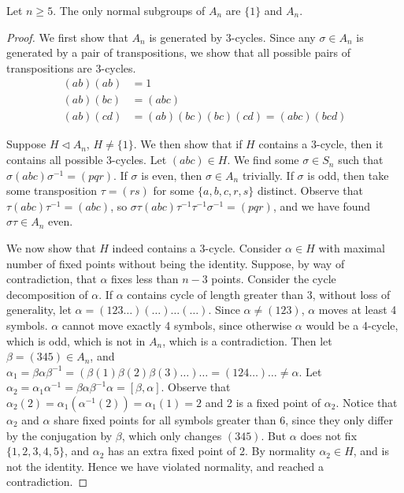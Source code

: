 \begin{theorem}\label{thm:an-simple}
    Let \(n \geq 5\).
    The only normal subgroups of \(A_n\) are \(\{1\}\) and \(A_n\).
\end{theorem}
\begin{proof}
    We first show that \(A_n\) is generated by 3-cycles.
    Since any \(\sigma \in A_n\) is generated by a pair of transpositions,
    we show that all possible pairs of transpositions are 3-cycles.
    \begin{align*}
        (ab)(ab) &= 1 \\
        (ab)(bc) &= (abc) \\
        (ab)(cd) &= (ab)(bc)(bc)(cd) = (abc)(bcd)
    \end{align*}

    Suppose \(H \lhd A_n\), \(H \neq \{1\}\).
    We then show that if \(H\) contains a 3-cycle,
    then it contains all possible 3-cycles.
    Let \((abc) \in H\).
    We find some \(\sigma \in S_n\) such that \(\sigma(abc)\sigma^{-1} = (pqr)\).
    If \(\sigma\) is even, then \(\sigma \in A_n\) trivially.
    If \(\sigma\) is odd, then take some transposition \(\tau = (rs)\)
    for some \(\{a,b,c,r,s\}\) distinct.
    Observe that \(\tau(abc)\tau^{-1} = (abc)\),
    so \(\sigma\tau(abc)\tau^{-1}\tau^{-1}\sigma^{-1} = (pqr)\),
    and we have found \(\sigma\tau \in A_n\) even.

    We now show that \(H\) indeed contains a 3-cycle.
    Consider \(\alpha \in H\) with maximal number of fixed points
    without being the identity.
    Suppose, by way of contradiction, that \(\alpha\) fixes less than \(n-3\) points.
    Consider the cycle decomposition of \(\alpha\).
    If \(\alpha\) contains cycle of length greater than 3,
    without loss of generality, let \(\alpha = (123\hdots)(\hdots)\hdots(\hdots)\).
    Since \(\alpha \neq (123)\), \(\alpha\) moves at least 4 symbols.
    \(\alpha\) cannot move exactly 4 symbols,
    since otherwise \(\alpha\) would be a 4-cycle,
    which is odd, which is not in \(A_n\), which is a contradiction.
    Then let \(\beta = (345) \in A_n\),
    and \(\alpha_1 = \beta\alpha\beta^{-1} = (\beta(1)\beta(2)\beta(3)\hdots)\hdots
    = (124\hdots)\hdots \neq \alpha\).
    Let \(\alpha_2 = \alpha_1\alpha^{-1} = \beta\alpha\beta^{-1}\alpha = [\beta,\alpha]\).
    Observe that \(\alpha_2(2) = \alpha_1(\alpha^{-1}(2)) = \alpha_1(1) = 2\)
    and 2 is a fixed point of \(\alpha_2\).
    Notice that \(\alpha_2\) and \(\alpha\) share fixed points
    for all symbols greater than 6,
    since they only differ by the conjugation by \(\beta\),
    which only changes \((345)\).
    But \(\alpha\) does not fix \(\{1,2,3,4,5\}\),
    and \(\alpha_2\) has an extra fixed point of 2.
    By normality \(\alpha_2 \in H\), and is not the identity.
    Hence we have violated normality, and reached a contradiction.


\end{proof}
